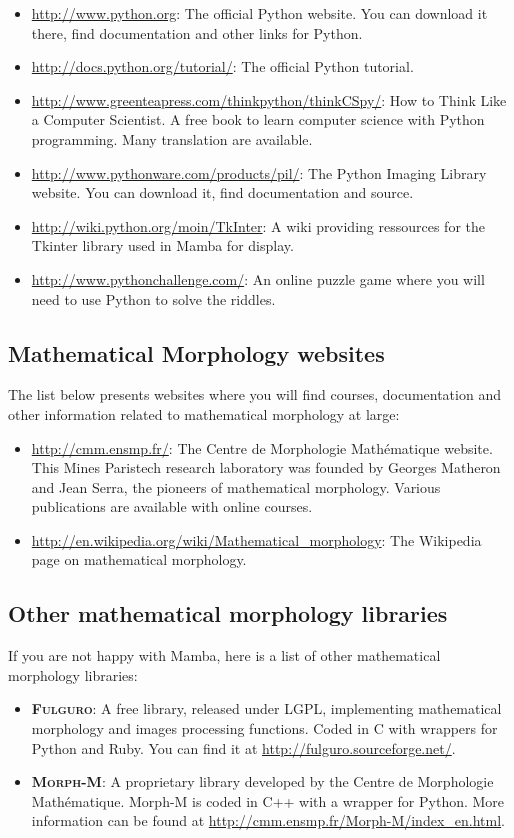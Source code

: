 \documentclass[a4paper,10pt,oneside]{article}
\begin{document}
\begin{itemize}
\item \url{http://www.python.org}: The official Python website. You can download
it there, find documentation and other links for Python.
\item \url{http://docs.python.org/tutorial/}: The official Python tutorial.
\item \url{http://www.greenteapress.com/thinkpython/thinkCSpy/}: How to Think 
Like a Computer Scientist. A free book to learn computer science with Python
programming. Many translation are available.
\item \url{http://www.pythonware.com/products/pil/}: The Python Imaging Library
website. You can download it, find documentation and source.
\item \url{http://wiki.python.org/moin/TkInter}: A wiki providing ressources
for the Tkinter library used in Mamba for display.
\item \url{http://www.pythonchallenge.com/}: An online puzzle game where you
will need to use Python to solve the riddles.
\end{itemize}

\subsection{Mathematical Morphology websites}

The list below presents websites where you will find courses, documentation and
other information related to mathematical morphology at large:

\begin{itemize}
\item \url{http://cmm.ensmp.fr/}: The Centre de Morphologie Math\'{e}matique
website. This Mines Paristech research laboratory was founded by Georges Matheron 
and Jean Serra, the pioneers of mathematical
morphology. Various publications are available with online courses.
\item \url{http://en.wikipedia.org/wiki/Mathematical_morphology}: The Wikipedia
page on mathematical morphology.
\end{itemize}

\subsection{Other mathematical morphology libraries}

If you are not happy with Mamba, here is a list of other mathematical morphology
libraries:

\begin{itemize}
\item \textsc{\textbf{Fulguro}}: A free library, released under LGPL, implementing
mathematical morphology and images processing functions. Coded in C with wrappers
for Python and Ruby. You can find it at \url{http://fulguro.sourceforge.net/}.
\item \textsc{\textbf{Morph-M}}: A proprietary library developed by the Centre
de Morphologie Math\'{e}matique. Morph-M is coded in C++ with a wrapper for
Python. More information can be found at \url{http://cmm.ensmp.fr/Morph-M/index_en.html}.
\end{itemize}
\end{document}
